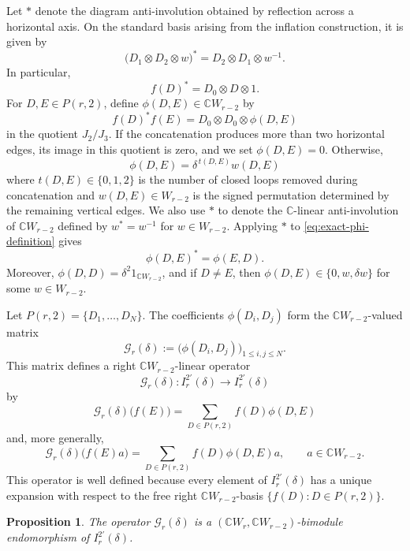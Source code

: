 \documentclass[10pt,a4paper]{amsart}
\newtheorem{proposition}[theorem]{Proposition}
\newcommand{\C}{\mathbb{C}}
\newcommand{\1}{\mathfrak{1}}
\begin{document}
Let $*$ denote the diagram anti-involution obtained by
reflection across a horizontal axis. On the standard basis arising from the inflation construction, it is given by
$$
\bigl(D_1\otimes D_2\otimes w\bigr)^*
=D_2\otimes D_1\otimes w^{-1}.
$$
In particular,
$$
f(D)^*=D_0\otimes D\otimes 1.
$$
For $D,E\in P(r,2)$, define $\phi(D,E)\in\C W_{r-2}$ by
\begin{equation}\label{eq:exact-phi-definition}
f(D)^*f(E)=D_0\otimes D_0\otimes\phi(D,E)
\end{equation}
in the quotient $J_2/J_3$. If the concatenation produces more than two horizontal edges, its image in this quotient is zero, and we set
$\phi(D,E)=0$. Otherwise,
$$
\phi(D,E)=\delta^{\,t(D,E)}w(D,E)
$$
where $t(D,E)\in\{0,1,2\}$ is the number of closed loops removed during concatenation and $w(D,E)\in W_{r-2}$ is the signed permutation determined by the remaining vertical edges. We also use $*$ to denote the $\C$-linear anti-involution
of $\C W_{r-2}$ defined by $w^*=w^{-1}$ for
$w\in W_{r-2}$. Applying $*$ to
\eqref{eq:exact-phi-definition} gives
$$
\phi(D,E)^*=\phi(E,D).
$$
Moreover, $\phi(D,D)=\delta^2 1_{\C W_{r-2}}$, and if $D\neq E$, then $\phi(D,E)\in\{0,w,\delta w\}$ for some $w\in W_{r-2}$.

Let $P(r,2)=\{D_1,\ldots,D_N\}$. The coefficients $\phi(D_i,D_j)$ form the $\C W_{r-2}$-valued matrix
$$
\mathcal G_r(\delta) := \bigl(\phi(D_i,D_j)\bigr)_{1\leq i,j\leq N}.
$$
This matrix defines a right $\C W_{r-2}$-linear operator
$$
\mathcal G_r(\delta):
I_r^{2'}(\delta)\longrightarrow I_r^{2'}(\delta)
$$
by
$$
\mathcal G_r(\delta)\bigl(f(E)\bigr) = \sum_{D\in P(r,2)}f(D)\phi(D,E)
$$
and, more generally,
$$
\mathcal G_r(\delta)\bigl(f(E)a\bigr)
=
\sum_{D\in P(r,2)}f(D)\phi(D,E)a,
\qquad a\in \C W_{r-2}.
$$
This operator is well defined because every element of $I_r^{2'}(\delta)$ has a unique expansion with respect to the free right $\C W_{r-2}$-basis $\{f(D):D\in P(r,2)\}$.

\begin{proposition}
\label{prop:auxiliary-operator-bimodule-map}
The operator $\mathcal G_r(\delta)$ is a $(\C W_r,\C W_{r-2})$-bimodule endomorphism of $I_r^{2'}(\delta)$.
\end{proposition}
\end{document}

